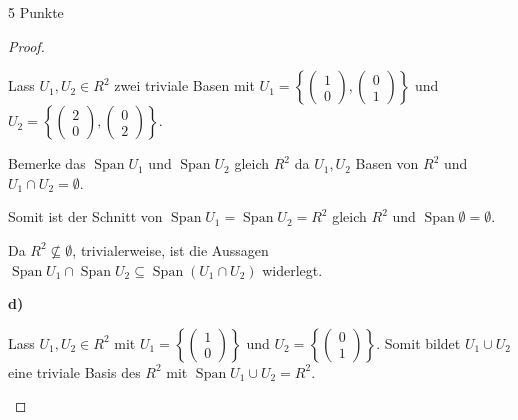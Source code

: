 \documentclass{problemset}
\begin{document}
\begin{problem}{5 Punkte}
\begin{proof}
\begin{enumerate}
              Lass \(U_1, U_2 \in R^2\) zwei triviale Basen mit \(U_1 = \left\{\begin{pmatrix}
                  1 \\ 0
              \end{pmatrix},
              \begin{pmatrix}
                  0 \\ 1
              \end{pmatrix}\right\}\) und \(U_2 = \left\{\begin{pmatrix}
                  2 \\ 0
              \end{pmatrix},
              \begin{pmatrix}
                  0 \\ 2
              \end{pmatrix}\right\}\).

              Bemerke das \(\operatorname{Span} U_1\) und \(\operatorname{Span} U_2\) gleich
              \(R^2\) da \(U_1, U_2\) Basen von \(R^2\) und \(U_1 \cap U_2 = \emptyset \).

              Somit ist der Schnitt von \(\operatorname{Span} U_1 = \operatorname{Span} U_2 =
              R^2\) gleich \(R^2\) und \(\operatorname{Span} \emptyset = \emptyset\).

              Da \(R^2 \not \subseteq \emptyset\), trivialerweise, ist die Aussagen
              \(\operatorname{Span} U_1 \cap \operatorname{Span} U_2 \subseteq
              \operatorname{Span}(U_1 \cap U_2)\) widerlegt. \checkmark

              \textbf{d)}

              Lass \(U_1, U_2 \in R^2\) mit \(U_1 = \left\{\begin{pmatrix}
                  1 \\0
              \end{pmatrix}\right\}\) und \(U_2 = \left\{\begin{pmatrix}
                  0 \\1
              \end{pmatrix}\right\}\).
              Somit bildet \(U_1 \cup U_2\) eine triviale Basis des \(R^2\) mit \(\operatorname{Span} U_1 \cup U_2 = R^2\).


\end{enumerate}
\end{proof}
\end{problem}
\end{document}
